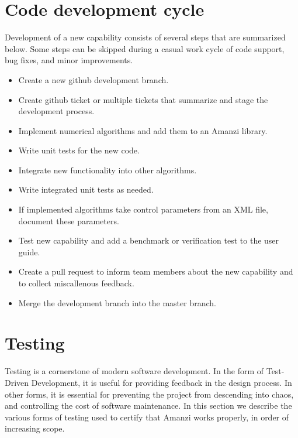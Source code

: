 
\section{Code development cycle}
Development of a new capability consists of several steps that are summarized below.
Some steps can be skipped during a casual work cycle of code support, bug fixes, and minor improvements. 

\begin{itemize}
\item Create a new github development branch.
\item Create github ticket or multiple tickets that summarize and stage the development process.
\item Implement numerical algorithms and add them to an Amanzi library.
\item Write unit tests for the new code.
\item Integrate new functionality into other algorithms.
\item Write integrated unit tests as needed.
\item If implemented algorithms take control parameters from an XML file, 
      document these parameters.
\item Test new capability and add a benchmark or verification test to the
      user guide.
\item Create a pull request to inform team members about the new capability and 
      to collect miscallenous feedback.
\item Merge the development branch into the master branch.
\end{itemize}
\clearpage



\section{Testing}
Testing is a cornerstone of modern software development. In the form of Test-Driven
Development, it is useful for providing feedback in the design process. In other 
forms, it is essential for preventing the project from descending into chaos, and 
controlling the cost of software maintenance. In this section we describe the 
various forms of testing used to certify that Amanzi works properly, in order of 
increasing scope.

